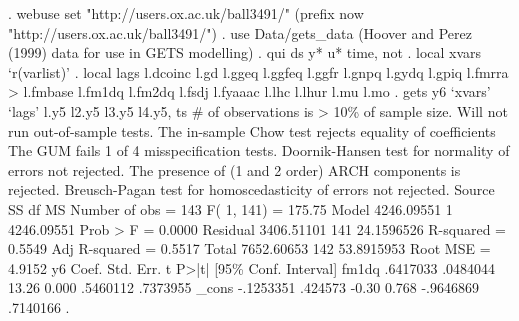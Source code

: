 . webuse set "http://users.ox.ac.uk/{\tytilde}ball3491/"
(prefix now "http://users.ox.ac.uk/{\tytilde}ball3491/")
{\smallskip}
. use Data/gets_data
(Hoover and Perez (1999) data for use in GETS modelling)
{\smallskip}
. qui ds y* u* time, not
{\smallskip}
. local xvars `r(varlist)' 
{\smallskip}
. local lags l.dcoinc l.gd l.ggeq l.ggfeq l.ggfr l.gnpq l.gydq l.gpiq l.fmrra
> l.fmbase l.fm1dq l.fm2dq l.fsdj l.fyaaac l.lhc l.lhur l.mu l.mo 
{\smallskip}
. gets y6 `xvars' `lags' l.y5 l2.y5 l3.y5 l4.y5, ts
\# of observations is > 10\% of sample size.  Will not run out-of-sample tests.
The in-sample Chow test rejects equality of coefficients
{\smallskip}
The GUM fails 1 of 4 misspecification tests.  Doornik-Hansen test for normality of errors not rejected.  The presence of (1 and 2 order) ARCH components is rejected. Breusch-Pagan test for homoscedasticity of errors not rejected.
{\smallskip}
{\smallskip}
      Source {\VBAR}       SS       df       MS              Number of obs =     143
           F(  1,   141) =  175.75
       Model {\VBAR}  4246.09551     1  4246.09551           Prob > F      =  0.0000
    Residual {\VBAR}  3406.51101   141  24.1596526           R-squared     =  0.5549
           Adj R-squared =  0.5517
       Total {\VBAR}  7652.60653   142  53.8915953           Root MSE      =  4.9152
{\smallskip}
          y6 {\VBAR}      Coef.   Std. Err.      t    P>|t|     [95\% Conf. Interval]
       fm1dq {\VBAR}   .6417033   .0484044    13.26   0.000     .5460112    .7373955
       _cons {\VBAR}  -.1253351    .424573    -0.30   0.768    -.9646869    .7140166
{\smallskip}
.  
